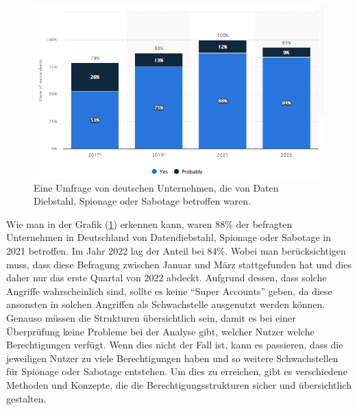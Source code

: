 \begin{figure}[h!]
 \centering
 \includegraphics[width=1\textwidth]{gfx/Picture/Cyber_Crime.PNG}
 \caption{Eine Umfrage von deutschen Unternehmen, die von Daten Diebstahl, Spionage oder Sabotage betroffen waren. \cite{Stat22}}
 \label{fig:Crime}
\end{figure}

Wie man in der Grafik (\ref{fig:Crime}) erkennen kann, waren 88\% der befragten Unternehmen in Deutschland von Datendiebstahl, Spionage oder Sabotage in 2021 betroffen.
Im Jahr 2022 lag der Anteil bei 84\%.
Wobei man berücksichtigen muss, dass diese Befragung zwischen Januar und März stattgefunden hat und dies daher nur das erste Quartal von 2022 abdeckt.
Aufgrund dessen, dass solche Angriffe wahrscheinlich sind, sollte es keine "`Super Accounts"' geben, da diese ansonsten in solchen Angriffen als Schwachstelle ausgenutzt werden können.
Genauso müssen die Strukturen übersichtlich sein, damit es bei einer Überprüfung keine Probleme bei der Analyse gibt, welcher Nutzer welche Berechtigungen verfügt.
Wenn dies nicht der Fall ist, kann es passieren, dass die jeweiligen Nutzer zu viele Berechtigungen haben und so weitere Schwachstellen für Spionage oder Sabotage entstehen.
Um dies zu erreichen, gibt es verschiedene Methoden und Konzepte, die die Berechtigungsstrukturen sicher und übersichtlich gestalten.

%
%
